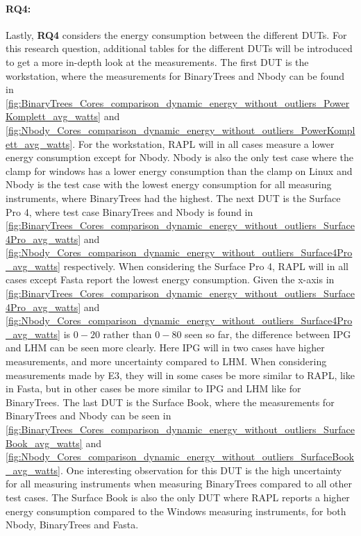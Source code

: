 


\paragraph*{RQ4:} Lastly, \textbf{RQ4} considers the energy consumption between the different DUTs. For this research question, additional tables for the different DUTs will be introduced to get a more in-depth look at the measurements. The first DUT is the workstation, where the measurements for BinaryTrees and Nbody can be found in \cref{fig:BinaryTrees_Cores_comparison_dynamic_energy_without_outliers_PowerKomplett_avg_watts} and \cref{fig:Nbody_Cores_comparison_dynamic_energy_without_outliers_PowerKomplett_avg_watts}. For the workstation, RAPL will in all cases measure a lower energy consumption except for Nbody. Nbody is also the only test case where the clamp for windows has a lower energy consumption than the clamp on Linux and Nbody is the test case with the lowest energy consumption for all measuring instruments, where BinaryTrees had the highest. The next DUT is the Surface Pro 4, where test case BinaryTrees and Nbody is found in \cref{fig:BinaryTrees_Cores_comparison_dynamic_energy_without_outliers_Surface4Pro_avg_watts} and \cref{fig:Nbody_Cores_comparison_dynamic_energy_without_outliers_Surface4Pro_avg_watts} respectively. When considering the Surface Pro 4, RAPL will in all cases except Fasta report the lowest energy consumption. Given the x-axis in \cref{fig:BinaryTrees_Cores_comparison_dynamic_energy_without_outliers_Surface4Pro_avg_watts} and \cref{fig:Nbody_Cores_comparison_dynamic_energy_without_outliers_Surface4Pro_avg_watts} is $0-20$ rather than $0-80$ seen so far, the difference between IPG and LHM can be seen more clearly. Here IPG will in two cases have higher measurements, and more uncertainty compared to LHM. When considering measurements made by E3, they will in some cases be more similar to RAPL, like in Fasta, but in other cases be more similar to IPG and LHM like for BinaryTrees. The last DUT is the Surface Book, where the measurements for BinaryTrees and Nbody can be seen in \cref{fig:BinaryTrees_Cores_comparison_dynamic_energy_without_outliers_SurfaceBook_avg_watts} and \cref{fig:Nbody_Cores_comparison_dynamic_energy_without_outliers_SurfaceBook_avg_watts}. One interesting observation for this DUT is the high uncertainty for all measuring instruments when measuring BinaryTrees compared to all other test cases. The Surface Book is also the only DUT where RAPL reports a higher energy consumption compared to the Windows measuring instruments, for both Nbody, BinaryTrees and Fasta.




